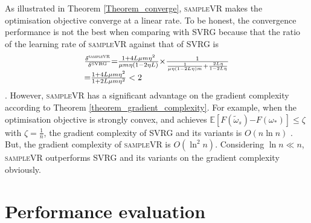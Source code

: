 \documentclass[letterpaper]{article}
\begin{document}
 As illustrated in Theorem \ref{Theorem_converge}, \textsc{sampleVR} makes the optimisation objective converge at a linear rate. To be honest,  the convergence performance is  not the best when comparing with SVRG  because that the ratio of the learning rate of \textsc{sampleVR} against that of \textsc{SVRG} is
\begin{equation}
\begin{array}{ll}
\frac{\delta^{\mathrm{\textsc{sampleVR}}}}{\delta^{\mathrm{SVRG}}} \mathrm{=} \frac{1+4L \mu m\eta^2}{\mu m \eta(1-2\eta L)} \mathrm{\times} \frac{1}{\frac{1}{\mu \eta(1-2L\eta)m} + \frac{2L\eta}{1-2L\eta}}  \\
\mathrm{=} \frac{1+4L\mu m \eta^2}{1+2L\mu m \eta^2} <2   \\
 \end{array} 
\end{equation}. However, \textsc{sampleVR} has a significant advantage on the gradient complexity according to Theorem \ref{theorem_gradient_complexity}. For example, when the optimisation objective is strongly convex, and achieves $\mathbb{E}[F(\tilde{\omega}_s)\mathrm{-}F(\omega_\ast)] \le \zeta$ with $\zeta=\frac{1}{n}$, the gradient complexity of SVRG and its variants is $O\left(n \ln n\right)$ \cite{Allen2015UniVR}. But, the gradient complexity of \textsc{sampleVR}  is $O( \ln^2 n ) $. Considering $\ln n \ll n$, \textsc{sampleVR}  outperforms SVRG and its variants on the gradient complexity obviously.




\section{Performance evaluation}
\label{sect_performance_evaluation}

\end{document}
